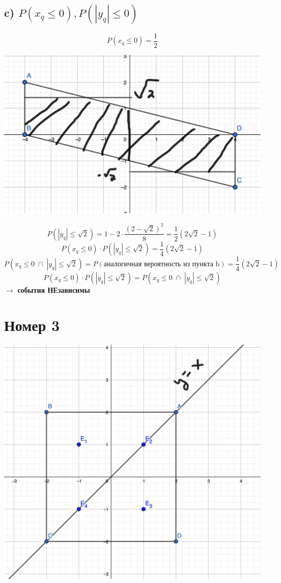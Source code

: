 \documentclass[a4paper,12pt]{article}
\begin{document}
\subsection*{c) $P(x_q \leq 0), P(|y_q| \leq 0)$}
\[
P(x_q \leq 0) = \frac{1}{2}
\]
\begin{center}
\includegraphics[scale=0.4]{5.png}
\end{center}
\[
P(|y_q| \leq \sqrt{2}) = 1 - 2 \cdot \frac{(2-\sqrt{2})^2}{8} = \frac{1}{2} (2 \sqrt{2} - 1)
\]
\[
P(x_q \leq 0)  \cdot P(|y_q| \leq \sqrt{2})  =  \frac{1}{4} (2 \sqrt{2} - 1)
\]
\[
P(x_q \leq 0\;  \cap  \; |y_q| \leq \sqrt{2}) = P(\text{аналогичная вероятность из пункта b}) = \frac{1}{4} \left(2\sqrt{2} - 1\right)
\]
\[
P(x_q \leq 0)  \cdot P(|y_q| \leq \sqrt{2})  = P(x_q \leq 0\;  \cap  \; |y_q| \leq \sqrt{2})
\]
$\rightarrow$ \textbf{события НЕзависимы}
\clearpage
\section*{Номер 3}
\begin{center}
\includegraphics[scale=0.2]{6.png}
\end{center}
\end{document}
